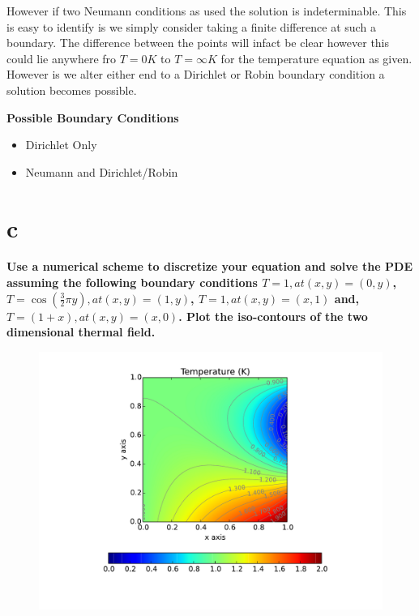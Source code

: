 \documentclass[10pt, a4paper]{article}
\begin{document}
However if two Neumann conditions as used the solution is indeterminable. This is easy to identify is we simply consider taking a finite difference at such a boundary. The difference between the points will infact be clear however this could lie anywhere fro $T = 0 K$ to $T=\infty K$ for the temperature 
equation as given. However is we alter either end to a Dirichlet or Robin boundary condition a solution becomes possible.

\textbf{Possible Boundary Conditions}

\begin{itemize}
\item Dirichlet Only
\item Neumann and Dirichlet/Robin
\end{itemize}
\section*{c}
\textbf{Use  a  numerical  scheme  to  discretize  your  equation  and  solve  the
PDE  assuming  the  following  boundary  conditions $T = 1, at (x,y) = (0,y)$, $T = \cos(\frac{3}{2} \pi y), at (x,y) = (1,y)$, $T = 1, at (x,y) = (x,1)$ and, $T = (1 + x), at (x,y) = (x,0)$.  Plot
the iso-contours of the two dimensional thermal  field.}

\begin{figure}[htb!]
\centering
    \includegraphics[width=1\linewidth, clip=true, trim = 2cm 1.9cm 2cm .9cm]{simp256}
    \label{fig:iso_contour}
\end{figure}
\end{document}
